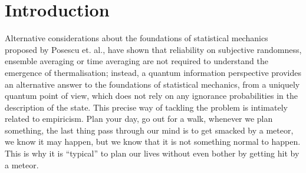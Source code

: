 
\chapter*{Introduction}

Alternative considerations about the foundations of statistical mechanics proposed by Posescu et. al.\cite{popescu_foundations_2005},  have shown that reliability on subjective randomness\cite{ma_statistical_1985}, ensemble averaging\cite{farquhar_ergodic_1965} or time averaging\cite{jancel_foundations_2013} are not required to understand the emergence of thermalisation; instead, a quantum information perspective\cite{horodecki_partial_2005} provides an alternative answer to the foundations of statistical mechanics, from a uniquely quantum point of view, which does not rely on any ignorance probabilities in the description of the state. This precise way of tackling the problem is intimately related to empiricism. 
Plan your day, go out for a walk, whenever we plan something, the last thing pass through our mind is to get smacked by a meteor, we know it may happen, but we know that it is not something normal to happen. This is why it is  ``typical'' to plan our lives without even bother by getting hit by a meteor.
